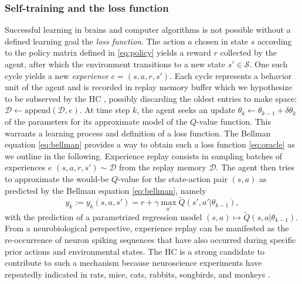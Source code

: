 \documentclass[10pt,letterpaper]{article}
\begin{document}
  \subsubsection{Self-training and the loss function}
  \label{sec:self}
Successful learning in brains and computer algorithms is not possible without a
defined learning goal \textemdash the \textit{loss function}.
The action $a$ chosen in state $s$ according to the policy matrix defined in
\eqref{eq:policy} yields a reward $r$ collected by the agent,
after which the environment transitions to a new state $s' \in \mathcal S$.
One such cycle yields a new \textit{experience} $e = (s,a,r,s')$.
Each cycle represents a behavior unit of the agent
and is recorded in replay memory buffer \textemdash
which we hypothesize to be subserved by the
HC \textemdash, possibly discarding the oldest entries to make space:
$\mathcal D \leftarrow \text{append}(\mathcal D, e)$.
At time step $k$, the agent seeks an update $\theta_{k} \leftarrow \theta_{k-1} + \delta \theta_{k}$ of the parameters for its approximate model of the $Q$-value function. This warrants a learning process
and definition of a loss function.
The Bellman equation \eqref{eq:bellman} provides a way to obtain such a loss function \eqref{eq:oracle} as we outline in the following.
Experience replay consists in sampling
batches of experiences $e$
$(s, a, r, s') \sim \mathcal D$ from the replay memory $\mathcal D$.
The agent then tries to approximate
the would-be $Q$-value for the state-action pair $(s,a)$ as predicted by the Bellman equation \eqref{eq:bellman}, namely
\begin{equation}
  y_k := y_k(s,a,s') =  r + \gamma \max_{a'} \tilde{Q}(s', a'|\theta_{k-1}),
\end{equation}
with the prediction of a parametrized regression model $(s,a)
\mapsto \tilde{Q}(s, a|\theta_{k-1})$.
From a neurobiological perspective,
experience replay can be manifested as the re-occurrence of
neuron spiking sequences that have also occurred during specific prior actions
and environmental states.
The HC is a strong candidate to contribute to such a mechanism
because neuroscience experiments have repeatedly indicated
in rats, mice, cats, rabbits, songbirds, and
monkeys \citep{buhry2011,nokia2010,dave2000,skaggs2007}.
\end{document}
